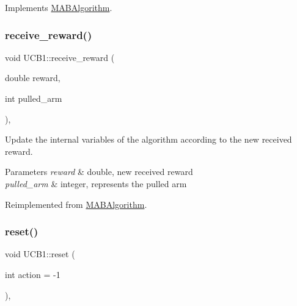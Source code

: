 Implements \mbox{\hyperlink{class_m_a_b_algorithm_afb48f01df0e1860d19759f6e20335007}{M\+A\+B\+Algorithm}}.

\mbox{\label{class_u_c_b1_a79106e98a38550c3f1f03e10f72226c6}} 
\subsubsection{\texorpdfstring{receive\+\_\+reward()}{receive\_reward()}}
{\footnotesize\ttfamily void U\+C\+B1\+::receive\+\_\+reward (\begin{DoxyParamCaption}\item[{double}]{reward,  }\item[{int}]{pulled\+\_\+arm }\end{DoxyParamCaption})\hspace{0.3cm}{\ttfamily [override]}, {\ttfamily [virtual]}}



Update the internal variables of the algorithm according to the new received reward. 


\begin{DoxyParams}{Parameters}
{\em reward} & double, new received reward \\
\hline
{\em pulled\+\_\+arm} & integer, represents the pulled arm \\
\hline
\end{DoxyParams}


Reimplemented from \mbox{\hyperlink{class_m_a_b_algorithm_aa584b3d6b86fa050e3389be9781b5782}{M\+A\+B\+Algorithm}}.

\mbox{\label{class_u_c_b1_aa426545f69a7e168ffcdcc3c9e8cd490}} 
\subsubsection{\texorpdfstring{reset()}{reset()}}
{\footnotesize\ttfamily void U\+C\+B1\+::reset (\begin{DoxyParamCaption}\item[{int}]{action = {\ttfamily -\/1} }\end{DoxyParamCaption})\hspace{0.3cm}{\ttfamily [override]}, {\ttfamily [virtual]}}



